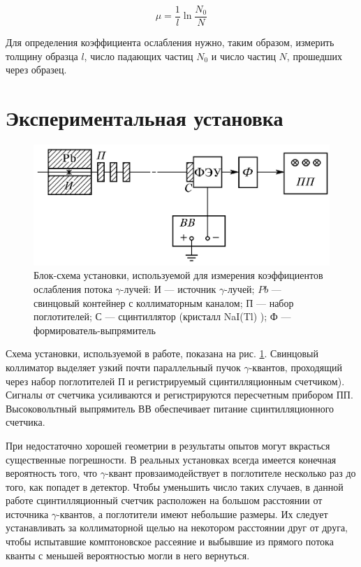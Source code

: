 \documentclass[a4paper,12pt]{article} %
\newcommand{\ga}{\ensuremath{\gamma}}
\begin{document}
	\begin{equation}\label{mu}
		\mu = \dfrac{1}{l} \ln{\dfrac{N_0}{N}}
	\end{equation}
	
	Для определения коэффициента ослабления нужно, таким образом, измерить толщину образца $ l $, число падающих частиц $ N_0 $ и число
	частиц $ N $, прошедших через образец.
	
	\section{Экспериментальная установка}
	
	\begin{figure}[h!]
		\centering
		\includegraphics[width=0.7\linewidth]{lab}
		\caption{Блок-схема установки, используемой для измерения коэффициентов ослабления потока \ga-лучей: И --- источник \ga-лучей; $ Pb $ --- свинцовый контейнер с коллиматорным каналом; П --- набор поглотителей; С --- сцинтиллятор (кристалл
			NaI(Tl) ); Ф --- формирователь-выпрямитель}
		\label{ris lab}
	\end{figure}
	
	Схема установки, используемой в работе, показана на рис. \ref{ris lab}. Свинцовый коллиматор выделяет узкий почти параллельный пучок \ga-квантов, проходящий через набор поглотителей П и регистрируемый сцинтилляционным счетчиком). Сигналы от счетчика усиливаются и регистрируются пересчетным прибором ПП. Высоковольтный выпрямитель ВВ обеспечивает питание сцинтилляционного счетчика.
	
	При недостаточно хорошей геометрии в результаты опытов могут
	вкрасться существенные погрешности. В реальных установках всегда имеется конечная вероятность того, что \ga-квант провзаимодействует в
	поглотителе несколько раз до того, как попадет в детектор. Чтобы уменьшить число таких случаев, в данной работе сцинтилляционный счетчик расположен на большом расстоянии от источника \ga-квантов, а поглотители имеют небольшие
	размеры. Их следует устанавливать за коллиматорной щелью на некотором расстоянии друг от друга, чтобы испытавшие комптоновское
	рассеяние и выбывшие из прямого потока кванты с меньшей вероятностью могли в него вернуться.
	
\end{document}
